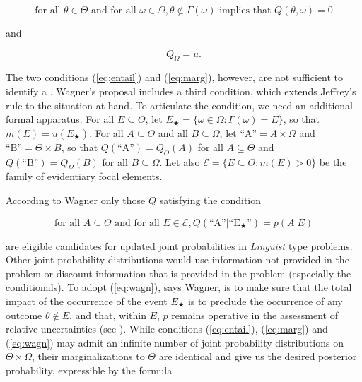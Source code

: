 \documentclass[11pt]{article}
\begin{document}
\begin{equation}
  \label{eq:entail}
  \mbox{for all }\theta\in\Theta\mbox{ and for all
  }\omega\in\Omega,\theta\notin\Gamma(\omega)\mbox{ implies that }Q(\theta,\omega)=0
\end{equation}

and

\begin{equation}
  \label{eq:marg}
  Q_{\Omega}=u.
\end{equation}

The two conditions (\ref{eq:entail}) and (\ref{eq:marg}), however, are
not sufficient to identify a  . Wagner's proposal includes a third
condition, which extends Jeffrey's rule to the situation at hand. To
articulate the condition, we need an additional formal apparatus. For
all $E\subseteq{}\Theta$, let
$E_{\bigstar}=\{\omega\in\Omega:\Gamma(\omega)=E\}$, so that
$m(E)=u(E_{\bigstar})$. For all $A\subseteq\Theta$ and all
$B\subseteq\Omega$, let $\mbox{``A''}=A\times\Omega$ and
$\mbox{``B''}=\Theta\times{}B$, so that
$Q(\mbox{``A''})=Q_{\Theta}(A)$ for all $A\subseteq\Theta$ and
$Q(\mbox{``B''})=Q_{\Omega}(B)$ for all $B\subseteq\Omega$. Let also
$\mathcal{E}=\{E\subseteq\Theta:m(E)>0\}$ be the family of evidentiary
focal elements.

According to Wagner only those $Q$ satisfying the condition

\begin{equation}
  \label{eq:wagn}
  \mbox{for all }A\subseteq\Theta\mbox{ and for all }E\in\mathcal{E},Q(\mbox{``A''}|\mbox{``E$_{\bigstar}$''})=p(A|E)
\end{equation}

are eligible candidates for updated joint probabilities in
\emph{Linguist} type problems. Other joint probability distributions
would use information not provided in the problem or discount
information that is provided in the problem (especially the
conditionals). To adopt (\ref{eq:wagn}), says Wagner, is to make sure
that the total impact of the occurrence of the event $E_{\bigstar}$ is
to preclude the occurrence of any outcome $\theta\notin{}E$, and that,
within $E$, $p$ remains operative in the assessment of relative
uncertainties (see ). While conditions
(\ref{eq:entail}), (\ref{eq:marg}) and (\ref{eq:wagn}) may admit an
infinite number of joint probability distributions on
$\Theta\times\Omega$, their marginalizations to $\Theta$ are identical
and give us the desired posterior probability, expressible by the
formula
\end{document}
